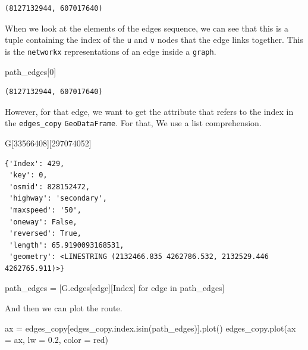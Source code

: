 \documentclass[
  letterpaper,
  DIV=11,
  numbers=noendperiod]{scrreprt}
\newenvironment{Shaded}{\begin{snugshade}}{\end{snugshade}}
\newcommand{\ControlFlowTok}[1]{\textcolor[rgb]{0.00,0.23,0.31}{#1}}
\newcommand{\DecValTok}[1]{\textcolor[rgb]{0.68,0.00,0.00}{#1}}
\newcommand{\FloatTok}[1]{\textcolor[rgb]{0.68,0.00,0.00}{#1}}
\newcommand{\KeywordTok}[1]{\textcolor[rgb]{0.00,0.23,0.31}{#1}}
\newcommand{\NormalTok}[1]{\textcolor[rgb]{0.00,0.23,0.31}{#1}}
\newcommand{\OperatorTok}[1]{\textcolor[rgb]{0.37,0.37,0.37}{#1}}
\newcommand{\StringTok}[1]{\textcolor[rgb]{0.13,0.47,0.30}{#1}}
\begin{document}
\begin{verbatim}
(8127132944, 607017640)
\end{verbatim}

When we look at the elements of the edges sequence, we can see that this
is a tuple containing the index of the \texttt{u} and \texttt{v} nodes
that the edge links together. This is the \texttt{networkx}
representations of an edge inside a \texttt{graph}.

\begin{Shaded}
\begin{Highlighting}[]
\NormalTok{path\_edges[}\DecValTok{0}\NormalTok{]}
\end{Highlighting}
\end{Shaded}

\begin{verbatim}
(8127132944, 607017640)
\end{verbatim}

However, for that edge, we want to get the attribute that refers to the
index in the \texttt{edges\_copy} \texttt{GeoDataFrame}. For that, We
use a list comprehension.

\begin{Shaded}
\begin{Highlighting}[]
\NormalTok{G[}\DecValTok{33566408}\NormalTok{][}\DecValTok{297074052}\NormalTok{]}
\end{Highlighting}
\end{Shaded}

\begin{verbatim}
{'Index': 429,
 'key': 0,
 'osmid': 828152472,
 'highway': 'secondary',
 'maxspeed': '50',
 'oneway': False,
 'reversed': True,
 'length': 65.9190093168531,
 'geometry': <LINESTRING (2132466.835 4262786.532, 2132529.446 4262765.911)>}
\end{verbatim}

\begin{Shaded}
\begin{Highlighting}[]
\NormalTok{path\_edges }\OperatorTok{=}\NormalTok{ [G.edges[edge][}\StringTok{\textquotesingle{}Index\textquotesingle{}}\NormalTok{] }\ControlFlowTok{for}\NormalTok{ edge }\KeywordTok{in}\NormalTok{ path\_edges]}
\end{Highlighting}
\end{Shaded}

And then we can plot the route.

\begin{Shaded}
\begin{Highlighting}[]
\NormalTok{ax }\OperatorTok{=}\NormalTok{ edges\_copy[edges\_copy.index.isin(path\_edges)].plot()}
\NormalTok{edges\_copy.plot(ax }\OperatorTok{=}\NormalTok{ ax, lw }\OperatorTok{=} \FloatTok{0.2}\NormalTok{, color }\OperatorTok{=} \StringTok{\textquotesingle{}red\textquotesingle{}}\NormalTok{)}
\end{Highlighting}
\end{Shaded}
\end{document}
